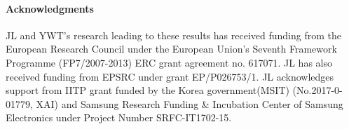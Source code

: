 \documentclass{article}
\begin{document}








\paragraph{Acknowledgments}
JL and YWT's research leading to these results has received funding from the
European Research Council under the European Union's Seventh Framework
Programme (FP7/2007-2013) ERC grant agreement no. 617071.
JL has also received funding from EPSRC under grant EP/P026753/1. JL acknowledges support from IITP grant funded by the Korea government(MSIT) (No.2017-0-01779, XAI) and Samsung Research Funding \& Incubation Center of Samsung Electronics under Project Number SRFC-IT1702-15.



\end{document}

